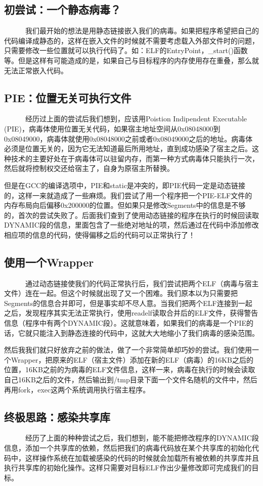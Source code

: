 \documentclass[11pt]{article}
\begin{document}
\subsection{初尝试：一个静态病毒？}
~~~~~~我们最开始的想法是用静态链接嵌入我们的病毒。如果把程序希望把自己的代码编译成静态的，这样在嵌入文件的时候就不需要考虑载入外部文件时的问题，只需要修改一些位置就可以执行代码了。如：ELF的EntryPoint，\_start()函数等。但是这样有可能造成的是，如果自己与目标程序的内存使用存在重叠，那么就无法正常嵌入代码。
\subsection{PIE：位置无关可执行文件}
~~~~~~经历过上面的尝试后我们想到，应该用Poistion Indipendent Executable (PIE)，病毒体使用位置无关代码，如果宿主地址空间从0x08048000到0x08049000，病毒体就使用0x08048000之前或者0x08049000之后的地址。病毒体必须是位置无关的，因为它无法知道最后所用地址，直到成功感染了宿主之后。这种技术的主要好处在于病毒体可以驻留内存，而第一种方式病毒体只能执行一次，然后就将控制权交还给宿主了，自身为原宿主所替换。

但是在GCC的编译选项中，PIE和static是冲突的，即PIE代码一定是动态链接的，这样一来就造成了一些麻烦。我们尝试了用一个程序把一个PIE-ELF文件的内存布局向后偏移0x200000的位置。但如果只是修改Segments中的信息是不够的，首次的尝试失败了。后面我们查到了使用动态链接的程序在执行的时候回读取DYNAMIC段的信息，里面包含了一些绝对地址的项，然后通过在代码中添加修改相应项的信息的代码，使得偏移之后的代码可以正常执行了！
\subsection{使用一个Wrapper}
~~~~~~通过动态链接使我们的代码正常执行后，我们尝试把两个ELF（病毒与宿主文件）连在一起。但这个时候就出现了又一个困难。我们原本以为只需要把Segments的信息合并即可，但是事实却不尽人意。当我们把两个ELF连接到一起之后，发现程序其实无法正常执行，使用readelf读取合并后的ELF文件，获得警告信息（程序中有两个DYNAMIC段）。这就意味着，如果我们的病毒是一个PIE的话，它就只能注入到静态连接的代码中，这就大大地缩小了我们病毒的感染范围。

然后我我们就只好放弃之前的做法，做了一个非常简单却巧妙的尝试。我们使用一个Wrapper，把原来的ELF（宿主文件）添加在新的ELF（病毒）的16KB之后的位置，16KB之前的为病毒的ELF文件信息，这样一来，病毒在执行的时候会读取自己16KB之后的文件，然后输出到/tmp目录下面一个文件名随机的文件中，然后再用fork，exec这两个系统调用执行宿主程序。

\subsection{终极思路：感染共享库}
~~~~~~经历了上面的种种尝试之后，我们想到，能不能把修改程序的DYNAMIC段信息，添加一个共享库的依赖，然后把我们的病毒代码放在某个共享库的初始化代码中，这样操作系统在加载被感染的代码的时候就会加载所有被依赖的共享库并且执行共享库的初始化操作。这样只需要对目标ELF作出少量修改即可完成我们的目标。
\end{document}
